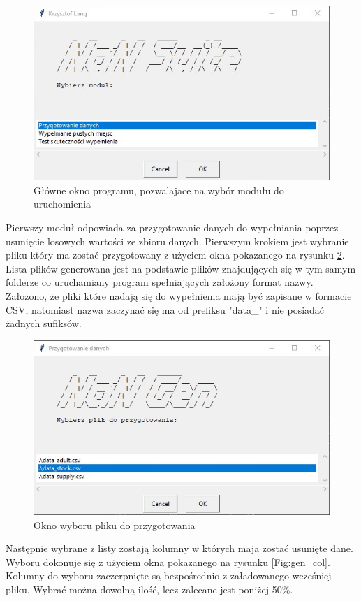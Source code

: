 \documentclass[12pt,twoside]{article}
\begin{document}
\begin{figure}[ht]
	\centering
	\includegraphics[width=12cm]{img/01.jpg}
	\caption{Główne okno programu, pozwalajace na wybór modułu do uruchomienia}
\label{Fig:main}
\end{figure}
\FloatBarrier

Pierwszy moduł odpowiada za przygotowanie danych do wypełniania poprzez usunięcie losowych wartości ze zbioru danych.
Pierwszym krokiem jest wybranie pliku który ma zostać przygotowany
z użyciem okna pokazanego na rysunku \ref{Fig:gen_file}.
Lista plików generowana jest na podstawie plików znajdujących się
w tym samym folderze co uruchamiany program spełniających założony format nazwy.
Założono, że pliki które nadają się do wypełnienia mają być zapisane w formacie CSV,
natomiast nazwa zaczynać się ma od prefiksu "data\_" i nie posiadać żadnych sufiksów.

\begin{figure}[ht]
	\centering
	\includegraphics[width=12cm]{img/02.jpg}
	\caption{Okno wyboru pliku do przygotowania}
\label{Fig:gen_file}
\end{figure}
\FloatBarrier

Następnie wybrane z listy zostają kolumny w których maja zostać usunięte dane.
Wyboru dokonuje się z użyciem okna pokazanego na rysunku \ref{Fig:gen_col}.
Kolumny do wyboru zaczerpnięte są bezpośrednio z załadowanego wcześniej pliku.
Wybrać można dowolną ilość, lecz zalecane jest poniżej 50\%.
\end{document}
